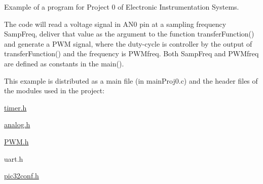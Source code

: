 Example of a program for Project 0 of Electronic Instrumentation Systems.

The code will read a voltage signal in AN0 pin at a sampling frequency Samp\+Freq, deliver that value as the argument to the function transfer\+Function() and generate a PWM signal, where the duty-\/cycle is controller by the output of transfer\+Function() and the frequency is PWMfreq. Both Samp\+Freq and PWMfreq are defined as constants in the main().

This example is distributed as a main file (in main\+Proj0.\+c) and the header files of the modules used in the project\+:
\begin{DoxyItemize}
\item \mbox{\hyperlink{timer_8h}{timer.\+h}}
\item \mbox{\hyperlink{analog_8h}{analog.\+h}}
\item \mbox{\hyperlink{PWM_8h}{PWM.\+h}}
\item uart.\+h
\item \mbox{\hyperlink{pic32conf_8h}{pic32conf.\+h}} 
\end{DoxyItemize}